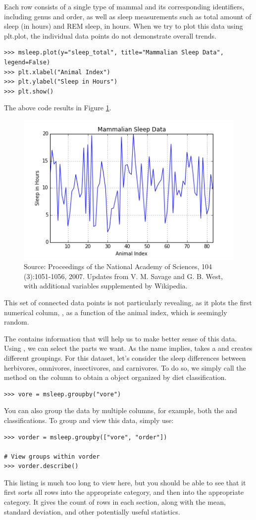 Each row consists of a single type of mammal and its corresponding identifiers, including genus and order, as well as sleep measurements such as total amount of sleep (in hours) and REM sleep, in hours.
When we try to plot this data using plt.plot, the individual data points do not demonstrate overall trends.
\begin{lstlisting}
>>> msleep.plot(y="sleep_total", title="Mammalian Sleep Data", legend=False)
>>> plt.xlabel("Animal Index")
>>> plt.ylabel("Sleep in Hours")
>>> plt.show()
\end{lstlisting}
The above code results in Figure \ref{fig:sleep}.
\begin{figure}[H] 
    \centering
    \includegraphics[width=.75\textwidth]{Msleep1.png}
    \caption{Source:  Proceedings of the National Academy of Sciences, 104 (3):1051-1056, 2007. Updates from V. M. Savage and G. B. West, with additional variables supplemented by Wikipedia.}
    \label{fig:sleep}
\end{figure}
This set of connected data points is not particularly revealing, as it plots the first numerical column, , as a function of the animal index, which is seemingly random.

The  contains information that will help us to make better sense of this data.
Using , we can select the parts we want. As the name implies,  takes a  and creates different groupings. For this dataset, let's consider the sleep differences between herbivores, omnivores, insectivores, and carnivores. To do so, we simply call the  method on the  column to obtain a  object organized by diet classification.
\begin{lstlisting}
>>> vore = msleep.groupby("vore")
\end{lstlisting}
You can also group the data by multiple columns, for example, both the  and  classifications.
To group and view this data, simply use:
\begin{lstlisting}
>>> vorder = msleep.groupby(["vore", "order"])

# View groups within vorder
>>> vorder.describe()
\end{lstlisting}
This listing is much too long to view here, but you should be able to see that it first sorts all rows into the appropriate  category, and then into the appropriate  category.  It gives the count of rows in each section, along with the mean, standard deviation, and other potentially useful statistics.

